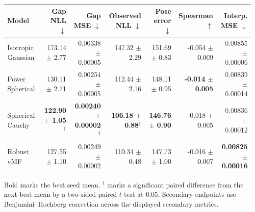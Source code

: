 \begin{tabular}{lrrrrrr}
\toprule
Model & Gap NLL $\downarrow$ & Gap MSE $\downarrow$ & Observed NLL $\downarrow$ & Pose error $\downarrow$ & Spearman $\uparrow$ & Interp. MSE $\downarrow$ \\
\midrule
Isotropic Gaussian & 173.14 $\pm$ 2.77 & 0.00338 $\pm$ 0.00005 & 147.32 $\pm$ 2.29 & 151.69 $\pm$ 0.83 & -0.054 $\pm$ 0.009 & 0.00855 $\pm$ 0.00006 \\
Power Spherical & 130.11 $\pm$ 2.71 & 0.00254 $\pm$ 0.00005 & 112.44 $\pm$ 2.16 & 148.11 $\pm$ 0.95 & \textbf{-0.014 $\pm$ 0.005} & 0.00839 $\pm$ 0.00014 \\
Spherical Cauchy & \textbf{122.90 $\pm$ 1.05}$^\dagger$ & \textbf{0.00240 $\pm$ 0.00002}$^\dagger$ & \textbf{106.18 $\pm$ 0.88}$^\dagger$ & \textbf{146.76 $\pm$ 0.90} & -0.018 $\pm$ 0.005 & 0.00836 $\pm$ 0.00012 \\
Robust vMF & 127.55 $\pm$ 1.10 & 0.00249 $\pm$ 0.00002 & 110.34 $\pm$ 0.48 & 147.73 $\pm$ 1.00 & -0.016 $\pm$ 0.007 & \textbf{0.00825 $\pm$ 0.00016} \\
\bottomrule
\end{tabular}
\par\smallskip
\footnotesize Bold marks the best seed mean. $^\dagger$ marks a significant paired difference from the next-best mean by a two-sided paired \(t\)-test at \(0.05\). Secondary endpoints use Benjamini--Hochberg correction across the displayed secondary metrics.
